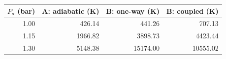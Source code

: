 \begin{tabular}{rrrr}
\toprule
$P_a$ (bar) & A: adiabatic (K) & B: one-way (K) & B: coupled (K) \\
\midrule
1.00 & 426.14 & 441.26 & 707.13 \\
1.15 & 1966.82 & 3898.73 & 4423.44 \\
1.30 & 5148.38 & 15174.00 & 10555.02 \\
\bottomrule
\end{tabular}
